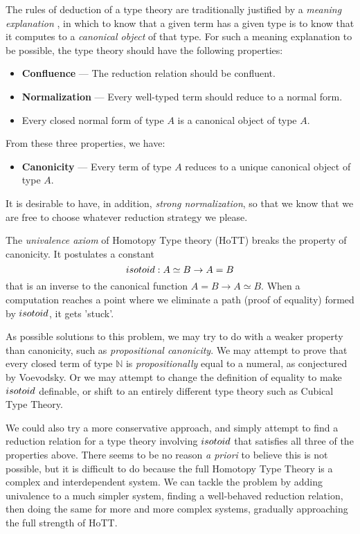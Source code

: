 The rules of deduction of a type theory are traditionally justified by a \emph{meaning explanation} \cite{ML:ITT}, in which to know that a given term has a given type is to know that it computes to a \emph{canonical object} of that type.  For such a meaning explanation to be possible, the type theory should have the following properties:
\begin{itemize}
\item \textbf{Confluence} --- The reduction relation should be confluent.
\item \textbf{Normalization} --- Every well-typed term should reduce to a normal form.
\item Every closed normal form of type $A$ is a canonical object of type $A$.
\end{itemize}
From these three properties, we have:
\begin{itemize}
\item \textbf{Canonicity} --- Every term of type $A$ reduces to a unique canonical object of type $A$.
\end{itemize}

It is desirable to have, in addition, \emph{strong normalization}, so that we know that we are free to choose whatever reduction strategy we please.

The \emph{univalence axiom} of Homotopy Type theory (HoTT) \cite{hottbook} breaks the property of canonicity.  It postulates a
constant
\[ isotoid : A \simeq B \rightarrow A = B \]
that is an inverse to the canonical function $A = B \rightarrow A \simeq B$.  When a computation reaches a point
where we eliminate a path (proof of equality) formed by $isotoid$, it gets 'stuck'.

As possible solutions to this problem, we may try to do with a weaker property than canonicity, such as \emph{propositional canonicity}.
We may attempt to prove that every closed term of type $\mathbb{N}$ is \emph{propositionally} equal to a numeral, as conjectured by Voevodsky.  Or we may attempt to change the definition of equality to make $isotoid$ definable\cite{Polonsky14a}, or
shift to an entirely different type theory such as Cubical Type Theory\cite{cchm:cubical}.

We could also try a more conservative approach, and simply attempt to find a reduction relation for a type theory involving $isotoid$ that satisfies
all three of the properties above.  There seems to be no reason \emph{a priori} to believe this is not possible, but it is difficult to do because
the full Homotopy Type Theory is a complex and interdependent system.  We can tackle the problem by adding univalence to a much simpler system, finding
a well-behaved reduction relation, then doing the same for more and more complex systems, gradually approaching the full strength of HoTT.

